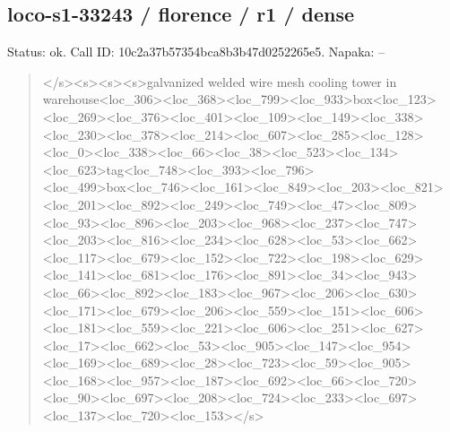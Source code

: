 \documentclass[10pt,a4paper]{article}
\begin{document}
\subsection*{loco-s1-33243 / florence / r1 / dense}
Status: ok. Call ID: 10c2a37b57354bca8b3b47d0252265e5. Napaka: --
\begin{quote}\footnotesize
</s>\allowbreak{}<s>\allowbreak{}<s>\allowbreak{}<s>\allowbreak{}galvanized welded wire mesh cooling tower in warehouse<loc\_306>\allowbreak{}<loc\_368>\allowbreak{}<loc\_\allowbreak{}799>\allowbreak{}<loc\_933>\allowbreak{}box<loc\_123>\allowbreak{}<loc\_26\allowbreak{}9>\allowbreak{}<loc\_376>\allowbreak{}<loc\_401>\allowbreak{}<loc\_109>\allowbreak{}<lo\allowbreak{}c\_149>\allowbreak{}<loc\_338>\allowbreak{}<loc\_230>\allowbreak{}<loc\_378\allowbreak{}>\allowbreak{}<loc\_214>\allowbreak{}<loc\_607>\allowbreak{}<loc\_285>\allowbreak{}<loc\allowbreak{}\_128>\allowbreak{}<loc\_0>\allowbreak{}<loc\_338>\allowbreak{}<loc\_66>\allowbreak{}<lo\allowbreak{}c\_38>\allowbreak{}<loc\_523>\allowbreak{}<loc\_134>\allowbreak{}<loc\_623>\allowbreak{}\allowbreak{}tag<loc\_748>\allowbreak{}<loc\_393>\allowbreak{}<loc\_796>\allowbreak{}<l\allowbreak{}oc\_499>\allowbreak{}box<loc\_746>\allowbreak{}<loc\_161>\allowbreak{}<loc\allowbreak{}\_849>\allowbreak{}<loc\_203>\allowbreak{}<loc\_821>\allowbreak{}<loc\_201>\allowbreak{}\allowbreak{}<loc\_892>\allowbreak{}<loc\_249>\allowbreak{}<loc\_749>\allowbreak{}<loc\_\allowbreak{}47>\allowbreak{}<loc\_809>\allowbreak{}<loc\_93>\allowbreak{}<loc\_896>\allowbreak{}<lo\allowbreak{}c\_203>\allowbreak{}<loc\_968>\allowbreak{}<loc\_237>\allowbreak{}<loc\_747\allowbreak{}>\allowbreak{}<loc\_203>\allowbreak{}<loc\_816>\allowbreak{}<loc\_234>\allowbreak{}<loc\allowbreak{}\_628>\allowbreak{}<loc\_53>\allowbreak{}<loc\_662>\allowbreak{}<loc\_117>\allowbreak{}<\allowbreak{}loc\_679>\allowbreak{}<loc\_152>\allowbreak{}<loc\_722>\allowbreak{}<loc\_1\allowbreak{}98>\allowbreak{}<loc\_629>\allowbreak{}<loc\_141>\allowbreak{}<loc\_681>\allowbreak{}<l\allowbreak{}oc\_176>\allowbreak{}<loc\_891>\allowbreak{}<loc\_34>\allowbreak{}<loc\_943\allowbreak{}>\allowbreak{}<loc\_66>\allowbreak{}<loc\_892>\allowbreak{}<loc\_183>\allowbreak{}<loc\_\allowbreak{}967>\allowbreak{}<loc\_206>\allowbreak{}<loc\_630>\allowbreak{}<loc\_171>\allowbreak{}<\allowbreak{}loc\_679>\allowbreak{}<loc\_206>\allowbreak{}<loc\_559>\allowbreak{}<loc\_1\allowbreak{}51>\allowbreak{}<loc\_606>\allowbreak{}<loc\_181>\allowbreak{}<loc\_559>\allowbreak{}<l\allowbreak{}oc\_221>\allowbreak{}<loc\_606>\allowbreak{}<loc\_251>\allowbreak{}<loc\_62\allowbreak{}7>\allowbreak{}<loc\_17>\allowbreak{}<loc\_662>\allowbreak{}<loc\_53>\allowbreak{}<loc\_\allowbreak{}905>\allowbreak{}<loc\_147>\allowbreak{}<loc\_954>\allowbreak{}<loc\_169>\allowbreak{}<\allowbreak{}loc\_689>\allowbreak{}<loc\_28>\allowbreak{}<loc\_723>\allowbreak{}<loc\_59\allowbreak{}>\allowbreak{}<loc\_905>\allowbreak{}<loc\_168>\allowbreak{}<loc\_957>\allowbreak{}<loc\allowbreak{}\_187>\allowbreak{}<loc\_692>\allowbreak{}<loc\_66>\allowbreak{}<loc\_720>\allowbreak{}<\allowbreak{}loc\_90>\allowbreak{}<loc\_697>\allowbreak{}<loc\_208>\allowbreak{}<loc\_72\allowbreak{}4>\allowbreak{}<loc\_233>\allowbreak{}<loc\_697>\allowbreak{}<loc\_137>\allowbreak{}<lo\allowbreak{}c\_720>\allowbreak{}<loc\_153>\allowbreak{}</s>\allowbreak{}

\end{quote}
\end{document}
